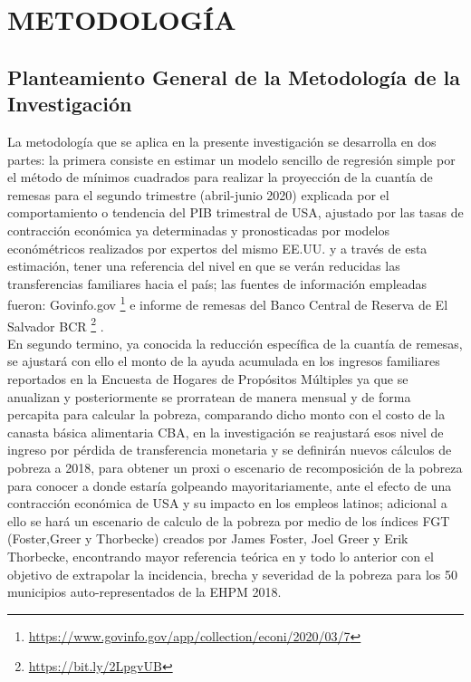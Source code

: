 \section{METODOLOGÍA}

\subsection{Planteamiento General de la Metodología de la Investigación}

La metodología que se aplica en la presente investigación se desarrolla en dos partes: la primera consiste en estimar un modelo sencillo de regresión simple por el método de mínimos cuadrados para realizar la proyección de la cuantía de remesas para el segundo trimestre (abril-junio 2020) explicada por el comportamiento o tendencia del PIB trimestral de USA, ajustado por las tasas de contracción económica ya determinadas y pronosticadas por modelos económétricos realizados por expertos del mismo EE.UU. y a través de esta estimación, tener una referencia del nivel en que se verán reducidas las transferencias familiares hacia el país; las fuentes de información empleadas fueron: Govinfo.gov \footnote{\href{https://www.govinfo.gov/app/collection/econi/2020/03/7}{https://www.govinfo.gov/app/collection/econi/2020/03/7}} e informe de remesas del Banco Central de Reserva de El Salvador BCR
\footnote{\href{https://www.bcr.gob.sv/esp/index.php?option=com_wrapper&view=wrapper&Itemid=469}{https://bit.ly/2LpgvUB}} .\\

En segundo termino, ya conocida la reducción específica de la cuantía de remesas, se ajustará con ello el monto de la ayuda acumulada en los ingresos familiares reportados en la Encuesta de Hogares de Propósitos Múltiples ya que se anualizan y posteriormente se prorratean de manera mensual y de forma percapita para calcular la pobreza, comparando dicho monto con el costo de la canasta básica alimentaria CBA, en la investigación se reajustará esos nivel de ingreso por pérdida de transferencia monetaria y se definirán nuevos cálculos de pobreza a 2018, para obtener un proxi o escenario de recomposición de la pobreza para conocer a donde estaría golpeando mayoritariamente, ante el efecto de una contracción económica de USA y su impacto en los empleos latinos; adicional a ello se hará un escenario de calculo de la pobreza por medio de los índices FGT (Foster,Greer y Thorbecke) creados por James Foster, Joel Greer y Erik Thorbecke, encontrando mayor referencia teórica en \cite{Foster} y \cite{feres2001enfoques} todo lo anterior con el objetivo de extrapolar la incidencia, brecha y severidad de la pobreza para los 50 municipios auto-representados de la EHPM 2018.\\

